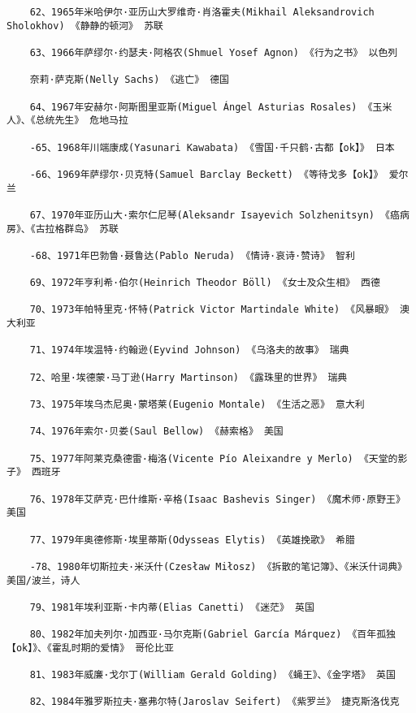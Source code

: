 \documentclass[UTF8]{../../RepresentationUniverse}
\begin{document}
\begin{lstlisting}
    62、1965年米哈伊尔·亚历山大罗维奇·肖洛霍夫(Mikhail Aleksandrovich Sholokhov) 《静静的顿河》 苏联
    
    63、1966年萨缪尔·约瑟夫·阿格农(Shmuel Yosef Agnon) 《行为之书》 以色列
    
    奈莉·萨克斯(Nelly Sachs) 《逃亡》 德国
    
    64、1967年安赫尔·阿斯图里亚斯(Miguel Ángel Asturias Rosales) 《玉米人》、《总统先生》 危地马拉
    
    -65、1968年川端康成(Yasunari Kawabata) 《雪国·千只鹤·古都【ok】》 日本
    
    -66、1969年萨缪尔·贝克特(Samuel Barclay Beckett) 《等待戈多【ok】》 爱尔兰
    
    67、1970年亚历山大·索尔仁尼琴(Aleksandr Isayevich Solzhenitsyn) 《癌病房》、《古拉格群岛》 苏联
    
    -68、1971年巴勃鲁·聂鲁达(Pablo Neruda) 《情诗·哀诗·赞诗》 智利
    
    69、1972年亨利希·伯尔(Heinrich Theodor Böll) 《女士及众生相》 西德
    
    70、1973年帕特里克·怀特(Patrick Victor Martindale White) 《风暴眼》 澳大利亚
    
    71、1974年埃温特·约翰逊(Eyvind Johnson) 《乌洛夫的故事》 瑞典
    
    72、哈里·埃德蒙·马丁逊(Harry Martinson) 《露珠里的世界》 瑞典
    
    73、1975年埃乌杰尼奥·蒙塔莱(Eugenio Montale) 《生活之恶》 意大利
    
    74、1976年索尔·贝娄(Saul Bellow) 《赫索格》 美国
    
    75、1977年阿莱克桑德雷·梅洛(Vicente Pío Aleixandre y Merlo) 《天堂的影子》 西班牙
    
    76、1978年艾萨克·巴什维斯·辛格(Isaac Bashevis Singer) 《魔术师·原野王》 美国
    
    77、1979年奥德修斯·埃里蒂斯(Odysseas Elytis) 《英雄挽歌》 希腊
    
    -78、1980年切斯拉夫·米沃什(Czesław Miłosz) 《拆散的笔记簿》、《米沃什词典》 美国/波兰，诗人
    
    79、1981年埃利亚斯·卡内蒂(Elias Canetti) 《迷茫》 英国
    
    80、1982年加夫列尔·加西亚·马尔克斯(Gabriel García Márquez) 《百年孤独【ok】》、《霍乱时期的爱情》 哥伦比亚
    
    81、1983年威廉·戈尔丁(William Gerald Golding) 《蝇王》、《金字塔》 英国
    
    82、1984年雅罗斯拉夫·塞弗尔特(Jaroslav Seifert) 《紫罗兰》 捷克斯洛伐克
    

\end{lstlisting}
\end{document}
